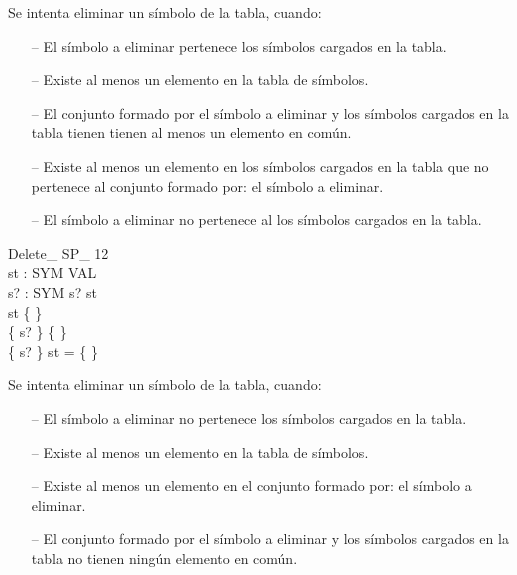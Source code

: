 \begin{tcolorbox}[colback=gray!5!white,colframe=gray!50!black,
  colbacktitle=gray!75!black,title=Delete\_ SP\_ 7]
  Se intenta eliminar un símbolo de la tabla, cuando:
     \begin{itemize}
        \item[--]{El símbolo a eliminar pertenece los símbolos cargados en la tabla.}
        \item[--]{Existe al menos un elemento en la tabla de símbolos.}
        \item[--]{El conjunto formado por el símbolo a eliminar y los símbolos cargados en la tabla tienen tienen al menos un elemento en común.}
        \item[--]{Existe al menos un elemento en los símbolos cargados en la tabla que no pertenece al conjunto formado por: el símbolo a eliminar.}
        \item[--]{El símbolo a eliminar no pertenece al los símbolos cargados en la tabla.}
     \end{itemize}
\end{tcolorbox}


\begin{schema}{Delete\_ SP\_ 12}\\
 st : SYM \pfun VAL \\
 s? : SYM 
\where
 s? \notin \dom st \\
 st \neq \{ \} \\
 \{ s? \} \neq \{ \} \\
 \{ s? \} \cap \dom st = \{ \}
\end{schema}

\begin{tcolorbox}[colback=gray!5!white,colframe=gray!50!black,
  colbacktitle=gray!75!black,title=Delete\_ SP\_ 12]
  Se intenta eliminar un símbolo de la tabla, cuando:
     \begin{itemize}
        \item[--]{El símbolo a eliminar no pertenece los símbolos cargados en la tabla.}
        \item[--]{Existe al menos un elemento en la tabla de símbolos.}
        \item[--]{Existe al menos un elemento en el conjunto formado por: el símbolo a eliminar.}
        \item[--]{El conjunto formado por el símbolo a eliminar y los símbolos cargados en la tabla no tienen ningún elemento en común.}
     \end{itemize}
\end{tcolorbox}



